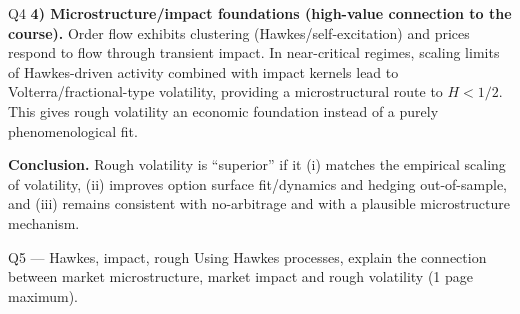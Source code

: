 \begin{solutionbox}{Q4}
\medskip
\textbf{4) Microstructure/impact foundations (high-value connection to the course).} Order flow exhibits clustering (Hawkes/self-excitation) and prices respond to flow through transient impact. In near-critical regimes, scaling limits of Hawkes-driven activity combined with impact kernels lead to Volterra/fractional-type volatility, providing a microstructural route to \(H<1/2\). This gives rough volatility an economic foundation instead of a purely phenomenological fit.

\medskip
\textbf{Conclusion.} Rough volatility is ``superior'' if it (i) matches the empirical scaling of volatility, (ii) improves option surface fit/dynamics and hedging out-of-sample, and (iii) remains consistent with no-arbitrage and with a plausible microstructure mechanism.
\end{solutionbox}

\begin{questionbox}{Q5 --- Hawkes, impact, rough}
Using Hawkes processes, explain the connection between market microstructure, market impact and rough volatility (1 page maximum).
\end{questionbox}

